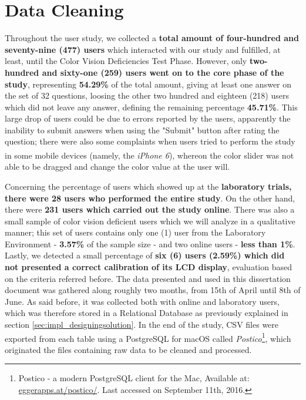 \section{Data Cleaning}
\label{sec:results_datacleaning}
%
Throughout the user study, we collected a \textbf{total amount of four-hundred and seventy-nine (477) users} which interacted with our study and fulfilled,
at least, until the Color Vision Deficiencies Test Phase. However, only \textbf{two-hundred and sixty-one (259) users went on to the core phase of the study},
representing \textbf{54.29\%} of the total amount, giving at least one answer on the set of 32 questions, loosing the other two hundred and eighteen
(218) users which did not leave any answer, defining the remaining percentage \textbf{45.71\%}. This large drop of users could be due to errors
reported by the users, apparently the inability to submit answers when using the "Submit" button after rating the question; there were also some complaints
when users tried to perform the study in some mobile devices (namely, the \emph{iPhone\textsuperscript{\textregistered} 6}), whereon the color slider was
not able to be dragged and change the color value at the user will. \par
%
Concerning the percentage of users which showed up at the \textbf{laboratory trials, there were 28 users who performed the entire study}.
On the other hand, there were \textbf{231 users which carried out the study online}. There was also a small sample of color vision
deficient users which we will analyze in a qualitative manner; this set of users contains only one (1) user from the Laboratory Environment - \textbf{3.57\%} of
the sample size - and two online users - \textbf{less than 1\%}. Lastly, we detected a small percentage of \textbf{six (6) users (2.59\%) which did not
presented a correct calibration of its LCD display}, evaluation based on the criteria referred before.
%
The data presented and used in this dissertation document was gathered along roughly two months, from 15th of April until 8th of June. As said before,
it was collected both with online and laboratory users, which was therefore stored in a Relational Database as previously explained in section
\ref{sec:impl_designingsolution}. In the end of the study, \gls{CSV} files were exported from each table using a PostgreSQL for macOS called
\emph{Postico}\footnote{Postico - a modern PostgreSQL client for the Mac, Available at: \url{eggerapps.at/postico/}. Last accessed on
September 11th, 2016.}, which originated the files containing raw data to be cleaned and processed. \par
